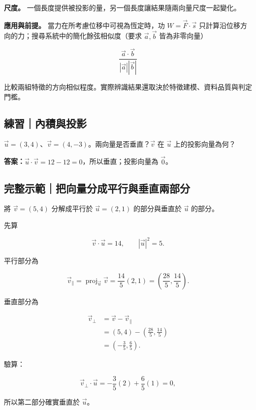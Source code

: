 \documentclass[11pt,a4paper]{article}
\begin{document}
\textbf{尺度。} 一個長度提供被投影的量，另一個長度讓結果隨兩向量尺度一起變化。

\textbf{應用與前提。} 當力在所考慮位移中可視為恆定時，功 \(W=\vec F\cdot\vec s\) 只計算沿位移方向的力；搜尋系統中的簡化餘弦相似度（要求 \(\vec a,\vec b\) 皆為非零向量）

\[
\frac{\vec a\cdot\vec b}{|\vec a||\vec b|}
\]

比較兩組特徵的方向相似程度。實際辨識結果還取決於特徵建模、資料品質與判定門檻。

\begin{HandoutSelfCheck}

\subsection{練習｜內積與投影}\label{ux7df4ux7fd2ux5167ux7a4dux8207ux6295ux5f71}

\(\vec u=(3,4)\)、\(\vec v=(4,-3)\)。兩向量是否垂直？\(\vec v\) 在 \(\vec u\) 上的投影向量為何？

\textbf{答案：}\(\vec u\cdot\vec v=12-12=0\)，所以垂直；投影向量為 \(\vec0\)。

\end{HandoutSelfCheck}

\begin{HandoutWorkedExample}

\subsection{完整示範｜把向量分成平行與垂直兩部分}\label{ux5b8cux6574ux793aux7bc4ux628aux5411ux91cfux5206ux6210ux5e73ux884cux8207ux5782ux76f4ux5169ux90e8ux5206}

將 \(\vec v=(5,4)\) 分解成平行於 \(\vec u=(2,1)\) 的部分與垂直於 \(\vec u\) 的部分。

先算

\[
\vec v\cdot\vec u=14,
\qquad
|\vec u|^2=5.
\]

平行部分為

\[
\vec v_{\parallel}
=\operatorname{proj}_{\vec u}\vec v
=\frac{14}{5}(2,1)
=\boxed{\left(\frac{28}{5},\frac{14}{5}\right)}.
\]

垂直部分為

\[
\begin{aligned}
\vec v_{\perp}
&=\vec v-\vec v_{\parallel}\\
&=\left(5,4\right)-\left(\frac{28}{5},\frac{14}{5}\right)\\
&=\boxed{\left(-\frac35,\frac65\right)}.
\end{aligned}
\]

驗算：

\[
\vec v_{\perp}\cdot\vec u
=-\frac35(2)+\frac65(1)=0,
\]

所以第二部分確實垂直於 \(\vec u\)。

\end{HandoutWorkedExample}
\end{document}
